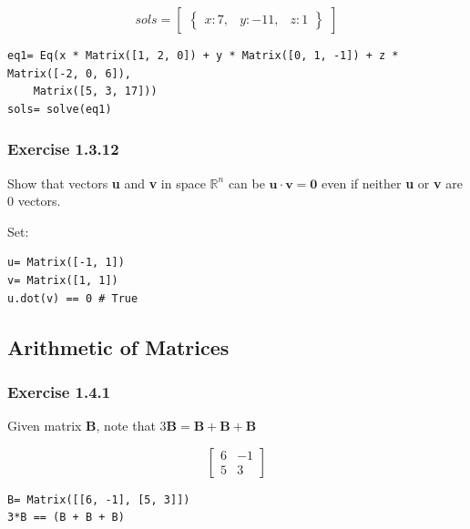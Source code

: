 \begin{equation}
sols= \begin{bmatrix}\begin{Bmatrix}x : 7, & y : -11, & z : 1\end{Bmatrix}\end{bmatrix}
\end{equation}

\begin{verbatim}
eq1= Eq(x * Matrix([1, 2, 0]) + y * Matrix([0, 1, -1]) + z * Matrix([-2, 0, 6]),
    Matrix([5, 3, 17]))
sols= solve(eq1)
\end{verbatim}

\subsubsection{Exercise 1.3.12}

Show that vectors \textbf{u} and \textbf{v} in space $\mathbb{R}^n$ can be
$\mathbf{u} \cdot{} \mathbf{v} = \mathbf{0}$ even if neither \textbf{u} or \textbf{v}
are 0 vectors.

Set:

\begin{verbatim}
u= Matrix([-1, 1])
v= Matrix([1, 1])
u.dot(v) == 0 # True
\end{verbatim}

\subsection{Arithmetic of Matrices}

\subsubsection{Exercise 1.4.1}

Given matrix \textbf{B}, note that $3\mathbf{B} = \mathbf{B} + \mathbf{B} + \mathbf{B}$

\begin{equation}
\left[\begin{matrix}6 & -1\\5 & 3\end{matrix}\right]
\end{equation}

\begin{verbatim}
B= Matrix([[6, -1], [5, 3]])
3*B == (B + B + B)
\end{verbatim}

